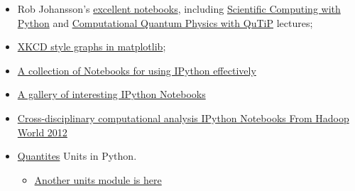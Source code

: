 \documentclass{article}
\begin{document}
\begin{itemize}
\itemsep1pt\parskip0pt
\item
  Rob Johansson's \href{http://jrjohansson.github.io/}{excellent
  notebooks}, including
  \href{https://github.com/jrjohansson/scientific-python-lectures}{Scientific
  Computing with Python} and
  \href{https://github.com/jrjohansson/qutip-lectures}{Computational
  Quantum Physics with QuTiP} lectures;
\item
  \href{http://nbviewer.ipython.org/url/jakevdp.github.com/downloads/notebooks/XKCD_plots.ipynb}{XKCD
  style graphs in matplotlib};
\item
  \href{https://github.com/ipython/ipython/tree/master/examples/notebooks\#a-collection-of-notebooks-for-using-ipython-effectively}{A
  collection of Notebooks for using IPython effectively}
\item
  \href{https://github.com/ipython/ipython/wiki/A-gallery-of-interesting-IPython-Notebooks}{A
  gallery of interesting IPython Notebooks}
\item
  \href{https://github.com/invisibleroads/crosscompute-tutorials}{Cross-disciplinary
  computational analysis IPython Notebooks From Hadoop World 2012}
\item
  \href{http://nbviewer.ipython.org/urls/raw.github.com/tbekolay/pyconca2012/master/QuantitiesTutorial.ipynb}{Quantites}
  Units in Python.

  \begin{itemize}
  \itemsep1pt\parskip0pt
  \item
    \href{http://www.southampton.ac.uk/~fangohr/blog/}{Another units
    module is here}
  \end{itemize}
\end{itemize}


    
    
    
    
\end{document}

